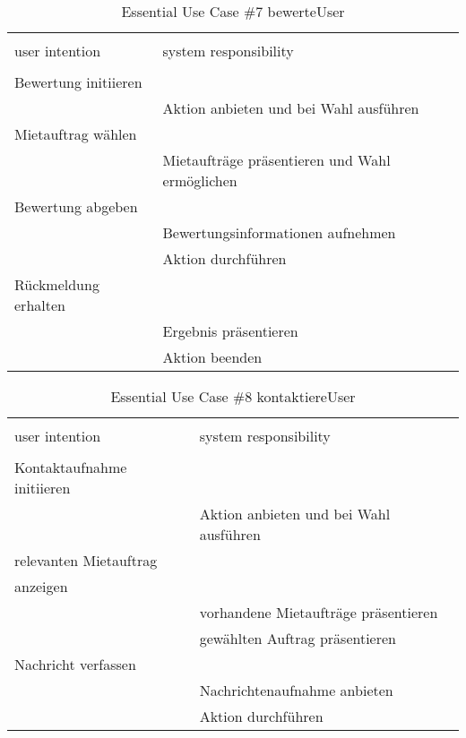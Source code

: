 \begin{table}[H]
\caption{Essential Use Case \#7 bewerteUser }
\centering
\begin{tabular}{l l}
\\ [-0.5ex]

\hline\hline
\\ [-0.5ex]
user intention & system responsibility
\\ [1.5ex]
\hline
\\ [-0.5ex]
Bewertung initiieren	 	& 											 \\[1ex]
							& Aktion anbieten und bei Wahl ausführen	 \\[1ex]
Mietauftrag wählen		  	& 											 \\[1ex] 
							& Mietaufträge präsentieren und Wahl ermöglichen \\[1ex]
Bewertung abgeben    		& 											 \\[1ex]
							& Bewertungsinformationen aufnehmen 		 \\[1ex]
							& Aktion durchführen						 \\[1ex]
Rückmeldung erhalten		&	     									 \\[1ex]
							& Ergebnis präsentieren				   		 \\[1ex]
							& Aktion beenden				    		 \\[1ex]

\hline
\end{tabular}
\label{tab:bewertung}
\end{table}

\begin{table}[H]
\caption{Essential Use Case \#8 kontaktiereUser }
\centering
\begin{tabular}{l l}
\\ [-0.5ex]

\hline\hline
\\ [-0.5ex]
user intention & system responsibility
\\ [1.5ex]
\hline
\\ [-0.5ex]
Kontaktaufnahme initiieren	& 											 \\[1ex]
							& Aktion anbieten und bei Wahl ausführen	 \\[1ex]
relevanten Mietauftrag    	& 											 \\[1ex] 
anzeigen					& 											 \\[1ex] 
							& vorhandene Mietaufträge präsentieren 		 \\[1ex]
							& gewählten Auftrag präsentieren			 \\[1ex]
Nachricht verfassen			& 											 \\[1ex]
							& Nachrichtenaufnahme anbieten				 \\[1ex]
							& Aktion durchführen			     		 \\[1ex]
\hline
\end{tabular}
\label{tab:kontaktaufnahme}
\end{table}

